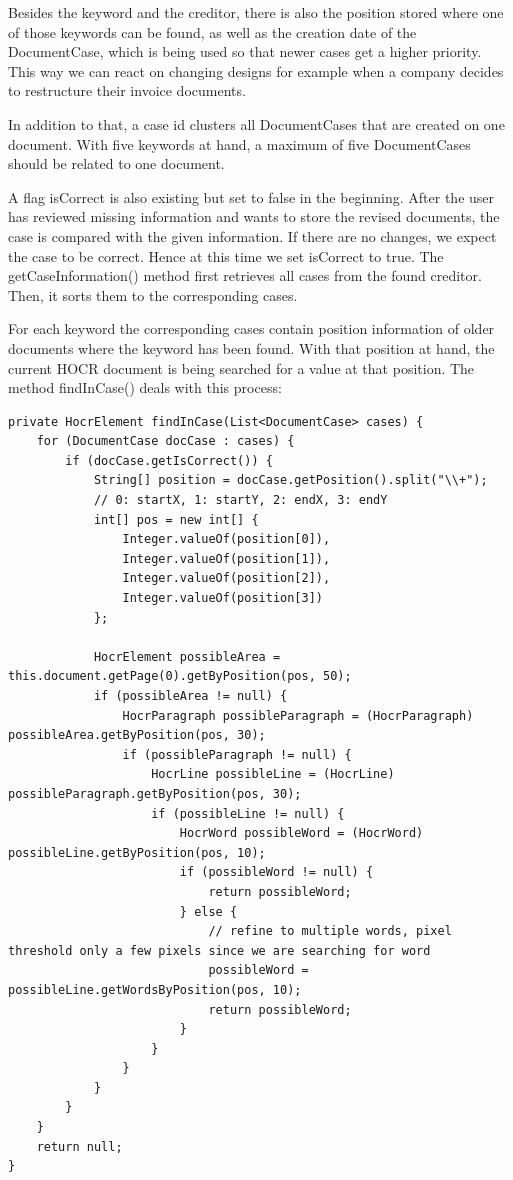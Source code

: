 Besides the keyword and the creditor, there is also the position stored where one of those keywords can be found, as well as the creation date of the DocumentCase, which is being used so that newer cases get a higher priority. This way we can react on changing designs for example when a company decides to restructure their invoice documents.

In addition to that, a case id clusters all DocumentCases that are created on one document. With five keywords at hand, a maximum of five DocumentCases should be related to one document.

A flag isCorrect is also existing but set to false in the beginning. After the user has reviewed missing information and wants to store the revised documents, the case is compared with the given information. If there are no changes, we expect the case to be correct. Hence at this time we set isCorrect to true.
The getCaseInformation() method first retrieves all cases from the found creditor. Then, it sorts them to the corresponding cases.

For each keyword the corresponding cases contain position information of older documents where the keyword has been found. With that position at hand, the current HOCR document is being searched for a value at that position. The method findInCase() deals with this process:

\begin{lstlisting}[caption={Search for information in the DocumentCase}]
private HocrElement findInCase(List<DocumentCase> cases) {
    for (DocumentCase docCase : cases) {
        if (docCase.getIsCorrect()) {
            String[] position = docCase.getPosition().split("\\+");
            // 0: startX, 1: startY, 2: endX, 3: endY
            int[] pos = new int[] {
				Integer.valueOf(position[0]), 
				Integer.valueOf(position[1]), 
				Integer.valueOf(position[2]), 
				Integer.valueOf(position[3])
			};

            HocrElement possibleArea = this.document.getPage(0).getByPosition(pos, 50);
            if (possibleArea != null) {
                HocrParagraph possibleParagraph = (HocrParagraph)  possibleArea.getByPosition(pos, 30);
                if (possibleParagraph != null) {
                    HocrLine possibleLine = (HocrLine) possibleParagraph.getByPosition(pos, 30);
                    if (possibleLine != null) {
                        HocrWord possibleWord = (HocrWord) possibleLine.getByPosition(pos, 10);
                        if (possibleWord != null) {
                            return possibleWord;
                        } else {
                            // refine to multiple words, pixel threshold only a few pixels since we are searching for word
                            possibleWord = possibleLine.getWordsByPosition(pos, 10);
                            return possibleWord;
                        }
                    }
                }
            }
        }
    }
    return null;
}
\end{lstlisting}

